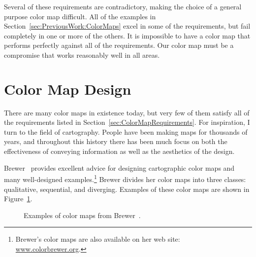 \documentclass[review,journal]{vgtc}         %
\newcommand{\scite}[1]{~\cite{#1}}
\begin{document}
Several of these requirements are contradictory, making the choice of a
general purpose color map difficult.  All of the examples in
Section~\ref{sec:PreviousWork:ColorMaps} excel in some of the requirements,
but fail completely in one or more of the others.  It is impossible to have
a color map that performs perfectly against all of the requirements.  Our color
map must be a compromise that works reasonably well in all areas.


\section{Color Map Design}
\label{sec:ColorMapDesign}

There are many color maps in existence today, but very few of them satisfy
all of the requirements listed in Section~\ref{sec:ColorMapRequirements}.
For inspiration, I turn to the field of cartography.  People
have been making maps for thousands of years, and throughout this history
there has been much focus on both the effectiveness of
conveying information as well as the aesthetics of the design.

Brewer\scite{Brewer05} provides excellent advice for designing cartographic
color maps and many well-designed examples.\footnote{Brewer's color maps
are also available on her web site:
\href{http://www.colorbrewer.org}{www.colorbrewer.org}.} Brewer divides her
color maps into three classes: qualitative, sequential, and diverging.
Examples of these color maps are shown in Figure~\ref{fig:BrewerExamples}.

\begin{figure}
  \centering
  \quad
  \quad
  \caption{Examples of color maps from Brewer\scite{Brewer05}.}
  \label{fig:BrewerExamples}
\end{figure}
\end{document}
